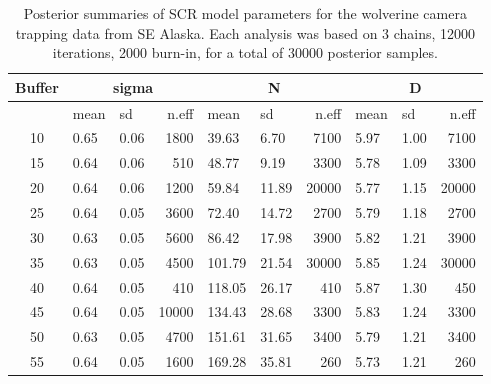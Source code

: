 \begin{table}
{\small
\centering
\caption{
Posterior summaries of SCR model parameters for the wolverine camera
trapping data from SE Alaska.
Each analysis was based on 3 chains, 12000 iterations, 2000 burn-in,
for a total of 30000 posterior samples.
}
\begin{tabular}{cllrllrllr}
Buffer &\multicolumn{3}{c}{sigma} & \multicolumn{3}{c}{N} & \multicolumn{3}{c}{D} \\
\hline \hline
   & mean &	sd	&n.eff&	mean &	sd   &n.eff&	mean&	sd&	n.eff \\ \hline
10&	0.65&	0.06&	1800&				39.63&	6.70& 7100&	5.97&	1.00&	7100 \\
15&	0.64&	0.06&	510&				48.77&	9.19&	3300&	5.78&	1.09&	3300\\
20&	0.64&	0.06&	1200&				59.84&	11.89&	20000&	5.77&	1.15&	20000\\
25&	0.64&	0.05&	3600&				72.40&	14.72&	2700&	5.79&	1.18&	2700\\
30&	0.63&	0.05&	5600&				86.42&	17.98&	3900&	5.82&	1.21&	3900\\
35&	0.63&	0.05&	4500&				101.79&	21.54&	30000&	5.85&	1.24&	30000\\
40&	0.64&	0.05&	410&				118.05&	26.17&	410&	5.87&	1.30&	450\\
45&	0.64&	0.05&	10000&				134.43&	28.68&	3300&	5.83&	1.24&	3300\\
50&	0.63&	0.05&	4700&				151.61&	31.65&	3400&	5.79&	1.21&	3400\\
55&	0.64&	0.05&	1600&				169.28&	35.81&
260&	5.73&	1.21&	260\\ \hline
\end{tabular}
}
\label{scr0.tab.wolverine-results}
\end{table}



